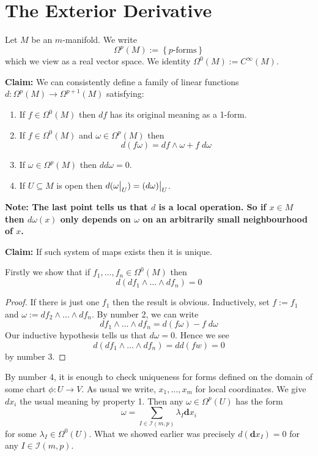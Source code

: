 \documentclass[11pt]{article}
\newcommand{\defeq}{:=}
\newcommand\restr[2]{{%
  \left.\kern-\nulldelimiterspace %
  #1 %
  \vphantom{\big|} %
  \right|_{#2} %
  }}
\newcommand{\mv}[1]{\textbf{#1}}
\newenvironment{note}
	{\begin{mdframed}[backgroundcolor=white, linecolor=RubineRed, roundcorner=5pt, linewidth=1pt]\bfseries{Note:}\normalfont
	\setlength{\parindent}{0pt}}
	{\end{mdframed}}
\begin{document}
\section{The Exterior Derivative}
Let $M$ be an $m$-manifold.
We write
\[
	\Omega^p(M)\defeq\left\{ p\text{-forms}\right\}
\]
which we view as a real vector space.
We identity $\Omega^0(M)\defeq C^\infty(M)$.

\noindent\textbf{Claim: }We can consistently define a family of linear functions $d:\Omega^p(M)\to \Omega^{p+1}(M)$ satisfying:

\begin{enumerate}
	\item If $f\in\Omega^0(M)$ then $df$ has its original meaning as a 1-form.
	\item If $f\in\Omega^0(M)$ and $\omega\in\Omega^p(M)$ then
		\[
			d(f\omega) = df \wedge \omega + f \; d\omega
		\]
	\item If $\omega\in\Omega^p(M)$ then $dd\omega =0$.
	\item If $U\subseteq M$ is open then $d(\restr{\omega}{U})=\restr{( d\omega )}{U}$.
\end{enumerate}

\begin{note}
The last point tells us that $d$ is a local operation.
So if $x\in M$ then $d\omega(x)$ only depends on $\omega$ on an arbitrarily small neighbourhood of $x$.
\end{note}

\noindent\textbf{Claim: }If such system of maps exists then it is unique.

Firstly we show that if $f_1, \dots , f_n\in\Omega^0(M)$ then
\[
	d(df_1 \wedge \dots \wedge df_n) = 0
\]

\begin{proof}
If there is just one $f_1$ then the result is obvious.
Inductively, set $f\defeq f_1$ and $\omega\defeq df_2 \wedge \dots \wedge df_n$.
By number 2, we can write
\[
	df_1 \wedge \dots \wedge df_n = d(f\omega) - f \; d\omega
\]
Our inductive hypothesis tells us that $d\omega = 0$.
Hence we see
\[
	d(df_1 \wedge \dots \wedge df_n) = dd(fw) = 0
\]
by number 3.
\end{proof}

By number 4, it is enough to check uniqueness for forms defined on the domain of some chart $\phi: U \to V$.
As usual we write, $x_1, \dots , x_m$ for local coordinates.
We give $dx_i$ the usual meaning by property 1.
Then any $\omega\in\Omega^p(U)$ has the form
\[
	\omega = \sum_{I\in\mathcal{I}(m, p)}\lambda_I \mv{d}x_i
\]
for some $\lambda_I\in \Omega^0(U)$.
What we showed earlier was precisely $d(\mv{d}x_I)=0$ for any $I\in\mathcal{I}(m, p)$.
\end{document}
